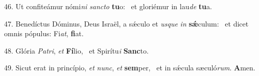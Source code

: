 46. Ut confiteámur nómi\textit{ni} \textit{sanc}\textit{to} \textbf{tu}o: \ast\  et gloriémur in lau\textit{de} \textbf{tu}a.\

47. Benedíctus Dóminus, Deus Israël, a sǽculo et \textit{us}\textit{que} \textit{in} \textbf{sǽ}culum: \ast\  et dicet omnis pópulus: Fi\textit{at}, \textbf{fi}at.\

48. Glória \textit{Pa}\textit{tri}, \textit{et} \textbf{Fí}lio, \ast\  et Spirítu\textit{i} \textbf{Sanc}to.\

49. Sicut erat in princípio, \textit{et} \textit{nunc}, \textit{et} \textbf{sem}per, \ast\  et in sǽcula sæculó\textit{rum}. \textbf{A}men.\

